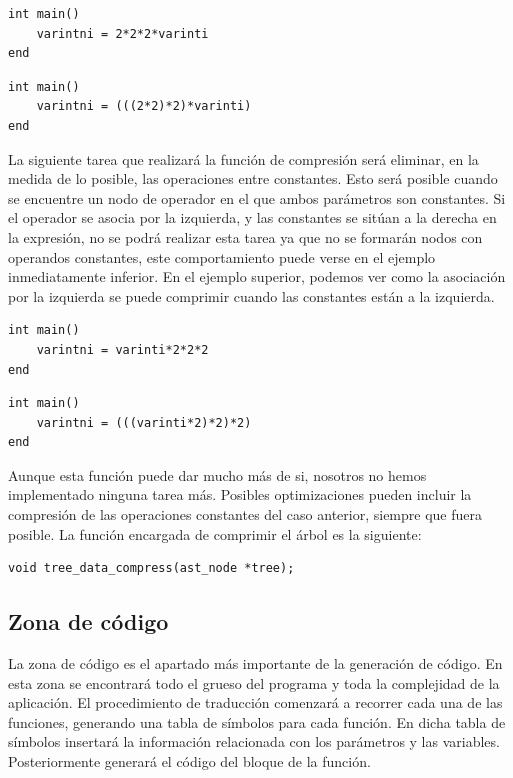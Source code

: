 \documentclass[a4paper,10pt]{article}
\begin{document}
\begin{multicols}{2}
\begin{lstlisting}[language=jam,frame=single]
int main()
	varintni = 2*2*2*varinti
end
\end{lstlisting}

\begin{lstlisting}[language=jam,frame=single]
int main()
	varintni = (((2*2)*2)*varinti)
end
\end{lstlisting}
\end{multicols}

La siguiente tarea que realizará la función de compresión será eliminar, en la medida de lo posible, las operaciones entre constantes. Esto será posible cuando se encuentre un nodo de operador en el que ambos parámetros son constantes. Si el operador se asocia por la izquierda, y las constantes se sitúan a la derecha en la expresión, no se podrá realizar esta tarea ya que no se formarán nodos con operandos constantes, este comportamiento puede verse en el ejemplo inmediatamente inferior. En el ejemplo superior, podemos ver como la asociación por la izquierda se puede comprimir cuando las constantes están a la izquierda.


\begin{multicols}{2}
\begin{lstlisting}[language=jam,frame=single]
int main()
	varintni = varinti*2*2*2
end
\end{lstlisting}

\begin{lstlisting}[language=jam,frame=single]
int main()
	varintni = (((varinti*2)*2)*2)
end
\end{lstlisting}
\end{multicols}

Aunque esta función puede dar mucho más de si, nosotros no hemos implementado ninguna tarea más. Posibles optimizaciones pueden incluir la compresión de las operaciones constantes del caso anterior, siempre que fuera posible. La función encargada de comprimir el árbol es la siguiente:
\begin{lstlisting}
void tree_data_compress(ast_node *tree);
\end{lstlisting}

\subsection{Zona de código}
La zona de código es el apartado más importante de la generación de código. En esta zona se encontrará todo el grueso del programa y toda la complejidad de la aplicación. El procedimiento de traducción comenzará a recorrer cada una de las funciones, generando una tabla de símbolos para cada función. En dicha tabla de símbolos insertará la información relacionada con los parámetros y las variables. Posteriormente generará el código del bloque de la función.
\end{document}
